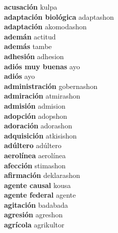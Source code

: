 \textbf{ acusación  } kulpa \\
\textbf{ adaptación biológica  } adaptashon \\
\textbf{ adaptación  } akomodashon \\
\textbf{ ademán  } actitud \\
\textbf{ además  } tambe \\
\textbf{ adhesión  } adhesion \\
\textbf{ adiós muy buenas  } ayo \\
\textbf{ adiós  } ayo \\
\textbf{ administración  } gobernashon \\
\textbf{ admiración  } atmirashon \\
\textbf{ admisión  } admision \\
\textbf{ adopción  } adopshon \\
\textbf{ adoración  } adorashon \\
\textbf{ adquisición  } atkisishon \\
\textbf{ adúltero  } adúltero \\
\textbf{ aerolínea  } aerolínea \\
\textbf{ afección  } stimashon \\
\textbf{ afirmación  } deklarashon \\
\textbf{ agente causal  } kousa \\
\textbf{ agente federal  } agente \\
\textbf{ agitación  } badabada \\
\textbf{ agresión  } agreshon \\
\textbf{ agrícola  } agrikultor \\
